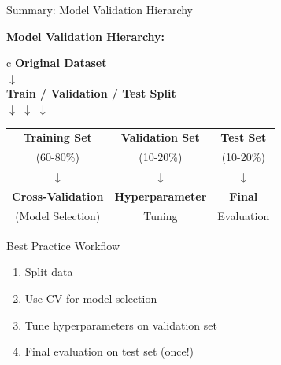 \documentclass[8pt,aspectratio=1610]{beamer}
\begin{document}
\begin{frame}{Summary: Model Validation Hierarchy}
\vspace{0.3cm}

\textbf{Model Validation Hierarchy:}

\begin{center}
\begin{tabular}{c}
\textcolor{green!80!black}{\textbf{Original Dataset}} \\
$\downarrow$ \\
\textcolor{yellow!80!black}{\textbf{Train / Validation / Test Split}} \\
$\downarrow$ \quad $\downarrow$ \quad $\downarrow$ \\
\begin{tabular}{@{}c@{\hspace{1cm}}c@{\hspace{1cm}}c@{}}
\textcolor{blue!80!black}{\textbf{Training Set}} & \textcolor{orange!80!black}{\textbf{Validation Set}} & \textcolor{red!80!black}{\textbf{Test Set}} \\
\textcolor{blue!80!black}{(60-80\%)} & \textcolor{orange!80!black}{(10-20\%)} & \textcolor{red!80!black}{(10-20\%)} \\
$\downarrow$ & $\downarrow$ & $\downarrow$ \\
\textcolor{purple!80!black}{\textbf{Cross-Validation}} & \textcolor{cyan!80!black}{\textbf{Hyperparameter}} & \textcolor{pink!80!black}{\textbf{Final}} \\
\textcolor{purple!80!black}{(Model Selection)} & \textcolor{cyan!80!black}{Tuning} & \textcolor{pink!80!black}{Evaluation}
\end{tabular}
\end{tabular}
\end{center}

\vspace{0.3cm}

\begin{alertblock}{Best Practice Workflow}
\begin{enumerate}
\item Split data
\item Use CV for model selection
\item Tune hyperparameters on validation set
\item Final evaluation on test set (once!)
\end{enumerate}
\end{alertblock}
\end{frame}
\end{document}
